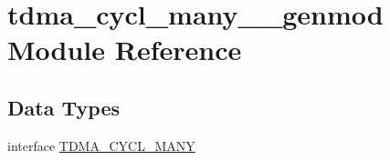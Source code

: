 \hypertarget{namespacetdma__cycl__many____genmod}{}\section{tdma\+\_\+cycl\+\_\+many\+\_\+\+\_\+genmod Module Reference}
\label{namespacetdma__cycl__many____genmod}
\subsection*{Data Types}
\begin{DoxyCompactItemize}
\item 
interface \mbox{\hyperlink{interfacetdma__cycl__many____genmod_1_1_t_d_m_a___c_y_c_l___m_a_n_y}{T\+D\+M\+A\+\_\+\+C\+Y\+C\+L\+\_\+\+M\+A\+NY}}
\end{DoxyCompactItemize}
